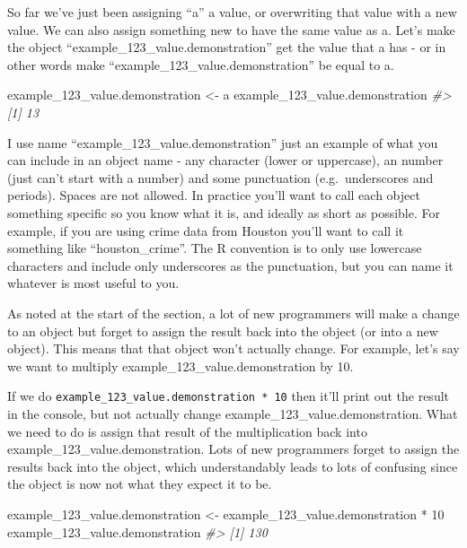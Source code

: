 \documentclass[
]{krantz}
\makeatletter
\newenvironment{Shaded}{\begin{snugshade}}{\end{snugshade}}
\newcommand{\CommentTok}[1]{\textcolor[rgb]{0.37,0.37,0.37}{\textit{#1}}}
\newcommand{\DecValTok}[1]{\textcolor[rgb]{0.06,0.06,0.06}{#1}}
\newcommand{\NormalTok}[1]{#1}
\newcommand{\OtherTok}[1]{\textcolor[rgb]{0.37,0.37,0.37}{#1}}
\newcommand{\SpecialCharTok}[1]{\textcolor[rgb]{0,0,0}{#1}}
\newenvironment{kframe}{%
\medskip{}
\setlength{\fboxsep}{.8em}
 \def\at@end@of@kframe{}%
 \ifinner\ifhmode%
  \def\at@end@of@kframe{\end{minipage}}%
  \begin{minipage}{\columnwidth}%
 \fi\fi%
 \def\FrameCommand##1{\hskip\@totalleftmargin \hskip-\fboxsep
 \colorbox{shadecolor}{##1}\hskip-\fboxsep
     \hskip-\linewidth \hskip-\@totalleftmargin \hskip\columnwidth}%
 \MakeFramed {\advance\hsize-\width
   \@totalleftmargin\z@ \linewidth\hsize
   \@setminipage}}%
 {\par\unskip\endMakeFramed%
 \at@end@of@kframe}
\renewenvironment{Shaded}{\begin{kframe}}{\end{kframe}}
\makeatother
\begin{document}
So far we've just been assigning ``a'' a value, or overwriting that value with a new value. We can also assign something new to have the same value as a. Let's make the object ``example\_123\_value.demonstration'' get the value that a has - or in other words make ``example\_123\_value.demonstration'' be equal to a.

\begin{Shaded}
\begin{Highlighting}[]
\NormalTok{example\_123\_value.demonstration }\OtherTok{\textless{}{-}}\NormalTok{ a}
\NormalTok{example\_123\_value.demonstration}
\CommentTok{\#\textgreater{} [1] 13}
\end{Highlighting}
\end{Shaded}

I use name ``example\_123\_value.demonstration'' just an example of what you can include in an object name - any character (lower or uppercase), an number (just can't start with a number) and some punctuation (e.g.~underscores and periods). Spaces are not allowed. In practice you'll want to call each object something specific so you know what it is, and ideally as short as possible. For example, if you are using crime data from Houston you'll want to call it something like ``houston\_crime''. The R convention is to only use lowercase characters and include only underscores as the punctuation, but you can name it whatever is most useful to you.

As noted at the start of the section, a lot of new programmers will make a change to an object but forget to assign the result back into the object (or into a new object). This means that that object won't actually change. For example, let's say we want to multiply example\_123\_value.demonstration by 10.

If we do \texttt{example\_123\_value.demonstration\ *\ 10} then it'll print out the result in the console, but not actually change example\_123\_value.demonstration. What we need to do is assign that result of the multiplication back into example\_123\_value.demonstration. Lots of new programmers forget to assign the results back into the object, which understandably leads to lots of confusing since the object is now not what they expect it to be.

\begin{Shaded}
\begin{Highlighting}[]
\NormalTok{example\_123\_value.demonstration }\OtherTok{\textless{}{-}}\NormalTok{ example\_123\_value.demonstration }\SpecialCharTok{*} \DecValTok{10}
\NormalTok{example\_123\_value.demonstration}
\CommentTok{\#\textgreater{} [1] 130}
\end{Highlighting}
\end{Shaded}
\end{document}
